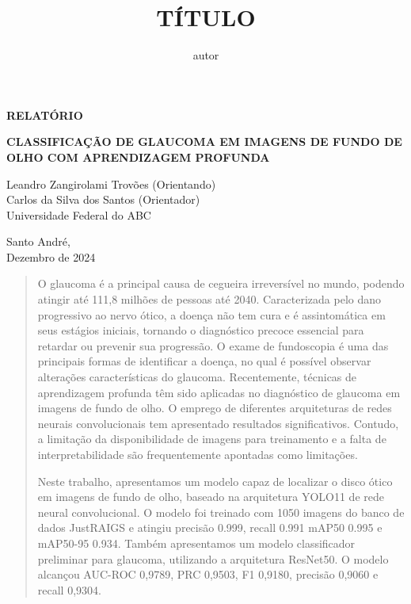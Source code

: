 \documentclass[12pt]{article}
\title{TÍTULO}
\author{autor}
\begin{document}
\thispagestyle{empty}
    \begin{flushright}
        \begin{huge}
            \textbf{RELATÓRIO}\\[3,5cm]
        \end{huge}
{\bf \LARGE  CLASSIFICAÇÃO DE GLAUCOMA EM IMAGENS DE FUNDO DE OLHO COM APRENDIZAGEM PROFUNDA}

\bigskip

        Leandro Zangirolami Trovões (Orientando)\\
        Carlos da Silva dos Santos (Orientador)\\
        Universidade Federal do ABC\\[5,5cm]
    \end{flushright}

    \vfill

    \begin{center}
        Santo André,\\
        Dezembro de 2024
    \end{center}

    \newpage
\bigskip

\begin{center}
\end{center}

\begin{quote}
O glaucoma é a principal causa de cegueira irreversível no mundo, podendo atingir até 111,8 milhões de pessoas até 2040. Caracterizada pelo dano progressivo ao nervo ótico, a doença não tem cura e é assintomática em seus estágios iniciais, tornando o diagnóstico precoce essencial para retardar ou prevenir sua progressão. O exame de fundoscopia é uma das principais formas de identificar a doença, no qual é possível observar alterações características do glaucoma. Recentemente, técnicas de aprendizagem profunda têm sido aplicadas no diagnóstico de glaucoma em imagens de fundo de olho. O emprego de diferentes arquiteturas de redes neurais convolucionais tem apresentado resultados significativos. Contudo, a limitação da disponibilidade de imagens para treinamento e a falta de interpretabilidade são frequentemente apontadas como limitações.

Neste trabalho, apresentamos um modelo capaz de localizar o disco ótico em imagens de fundo de olho, baseado na arquitetura YOLO11 de rede neural convolucional. O modelo foi treinado com 1050 imagens do banco de dados JustRAIGS e atingiu precisão 0.999, recall 0.991 mAP50 0.995 e mAP50-95 0.934. Também apresentamos um modelo classificador preliminar para glaucoma, utilizando a arquitetura ResNet50. O modelo alcançou AUC-ROC 0,9789, PRC 0,9503, F1 0,9180, precisão 0,9060 e recall 0,9304.

\end{quote}
\end{document}
